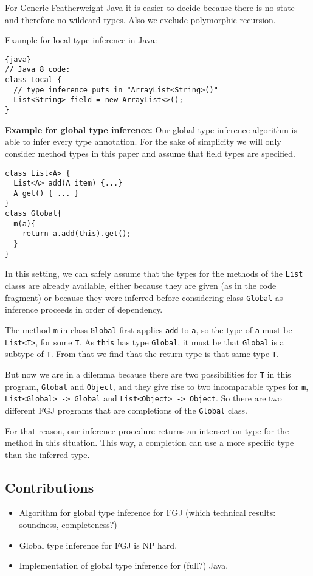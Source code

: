 For Generic Featherweight Java it is easier to decide because there is no state and therefore no wildcard types.
Also we exclude polymorphic recursion.

Example for local type inference in Java:
\begin{lstlisting}{java}
// Java 8 code:
class Local {
  // type inference puts in "ArrayList<String>()"
  List<String> field = new ArrayList<>();
}
\end{lstlisting}

\textbf{Example for global type inference:}
Our global type inference algorithm is able to infer every type annotation.
For the sake of simplicity we will only consider method types in this
paper and assume that field types are specified.
\begin{lstlisting}
class List<A> {
  List<A> add(A item) {...}
  A get() { ... }
}
class Global{
  m(a){
    return a.add(this).get();
  }
}
\end{lstlisting}
In this setting, we can safely assume that the types for the methods of the \lstinline{List} classs
are already available, either because they are given (as in the code
fragment) or because they were
inferred before considering class \lstinline{Global} as inference
proceeds in order of dependency.

The method \texttt{m} in class \texttt{Global} first applies
\texttt{add} to \texttt{a}, so the type of \texttt{a} must be
\lstinline{List<T>}, for some \lstinline{T}. As \lstinline{this} has
type \lstinline{Global}, it must be that \lstinline{Global} is a
subtype of \lstinline{T}. From that we find that the return type is
that same type \lstinline{T}.

But now we are in a dilemma because there are two possibilities for
\lstinline{T} in this program, \lstinline{Global} and
\lstinline{Object}, and they give rise to two incomparable types for
\lstinline{m}, \lstinline{List<Global> -> Global} and
\lstinline{List<Object> -> Object}. So there are two different FGJ
programs that are completions of the \lstinline{Global} class.

For that reason, our inference procedure returns an intersection type
for the method in this situation. This way, a completion can use a
more specific type than the inferred type.

\subsection{Contributions}
\label{sec:contributions}

\begin{itemize}
\item Algorithm for global type inference for FGJ (which technical 
  results: soundness, completeness?)
\item Global type inference for FGJ is NP hard.
\item Implementation of global type inference for (full?) Java.
\end{itemize}


